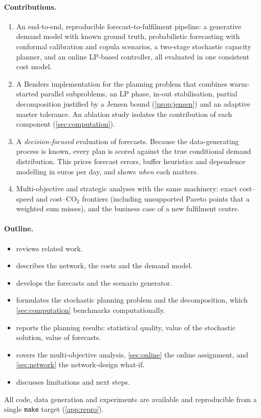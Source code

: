 \paragraph{Contributions.}
\begin{enumerate}
  \item An end-to-end, reproducible forecast-to-fulfilment pipeline: a generative demand model with known ground truth, probabilistic forecasting with conformal calibration and copula scenarios, a two-stage stochastic capacity planner, and an online LP-based controller, all evaluated in one consistent cost model.
  \item A Benders implementation for the planning problem that combines warm-started parallel subproblems, an LP phase, in-out stabilisation, partial decomposition justified by a Jensen bound (\cref{prop:jensen}) and an adaptive master tolerance. An ablation study isolates the contribution of each component (\cref{sec:computation}).
  \item A \emph{decision-focused} evaluation of forecasts. Because the data-generating process is known, every plan is scored against the true conditional demand distribution. This prices forecast errors, buffer heuristics and dependence modelling in euros per day, and shows \emph{when} each matters.
  \item Multi-objective and strategic analyses with the same machinery: exact cost--speed and cost--CO$_2$ frontiers (including unsupported Pareto points that a weighted sum misses), and the business case of a new fulfilment centre.
\end{enumerate}

\paragraph{Outline.}
\begin{itemize}
  \item {} reviews related work.
  \item {} describes the network, the costs and the demand model.
  \item {} develops the forecasts and the scenario generator.
  \item {} formulates the stochastic planning problem and the decomposition, which \cref{sec:computation} benchmarks computationally.
  \item {} reports the planning results: statistical quality, value of the stochastic solution, value of forecasts.
  \item {} covers the multi-objective analysis, \cref{sec:online} the online assignment, and \cref{sec:network} the network-design what-if.
  \item {} discusses limitations and next steps.
\end{itemize}
All code, data generation and experiments are available and reproducible from a single \texttt{make} target (\cref{app:repro}).
